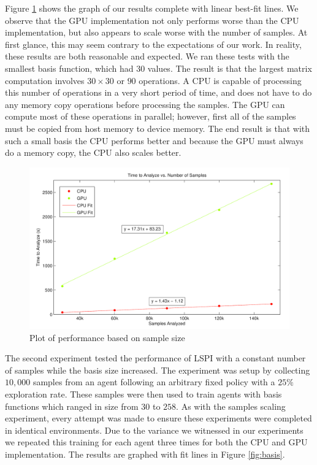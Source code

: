 Figure \ref{fig:samples} shows the graph of our results complete with linear best-fit lines. We observe that the GPU implementation not only performs worse than the CPU implementation, but also appears to scale worse with the number of samples. At first glance, this may seem contrary to the expectations of our work. In reality, these results are both reasonable and expected. We ran these tests with the smallest basis function, which had $30$ values. The result is that the largest matrix computation involves $30 \times 30$ or $90$ operations. A CPU is capable of processing this number of operations in a very short period of time, and does not have to do any memory copy operations before processing the samples. The GPU can compute most of these operations in parallel; however, first all of the samples must be copied from host memory to device memory. The end result is that with such a small basis the CPU performs better and because the GPU must always do a memory copy, the CPU also scales better.

\begin{figure}
	\includegraphics[width=0.75\paperwidth]{Time_vs_Samples.png}
    \caption{Plot of performance based on sample size}
	\label{fig:samples}
\end{figure}

The second experiment tested the performance of LSPI with a constant number of samples while the basis size increased. The experiment was setup by collecting $10,000$ samples from an agent following an arbitrary fixed policy with a $25\%$ exploration rate. These samples were then used to train agents with basis functions which ranged in size from $30$ to $258$. As with the samples scaling experiment, every attempt was made to ensure these experiments were completed in identical environments. Due to the variance we witnessed in our experiments we repeated this training for each agent three times for both the CPU and GPU implementation. The results are graphed with fit lines in Figure \ref{fig:basis}.

